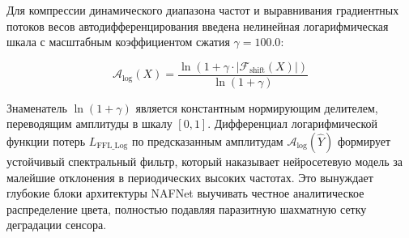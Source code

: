 \documentclass[12pt,a4paper]{article}
\begin{document}
Для компрессии динамического диапазона частот и выравнивания градиентных потоков весов автодифференцирования введена нелинейная логарифмическая шкала с масштабным коэффициентом сжатия $\gamma = 100.0$:

\begin{equation}
\mathcal{A}_{\log}(X) = \frac{\ln\left(1 + \gamma \cdot |\mathcal{F}_{\text{shift}}(X)|\right)}{\ln(1 + \gamma)}
\end{equation}

Знаменатель $\ln(1 + \gamma)$ является константным нормирующим делителем, переводящим амплитуды в шкалу $[0, 1]$. Дифференциал логарифмической функции потерь $L_{\text{FFL\_Log}}$ по предсказанным амплитудам $\mathcal{A}_{\log}(\hat{Y})$ формирует устойчивый спектральный фильтр, который наказывает нейросетевую модель за малейшие отклонения в периодических высоких частотах. Это вынуждает глубокие блоки архитектуры NAFNet выучивать честное аналитическое распределение цвета, полностью подавляя паразитную шахматную сетку деградации сенсора.
\end{document}
